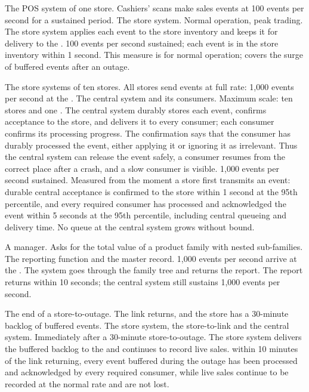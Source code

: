   {The POS system of one store.}
  {Cashiers' scans make sales events at 100 events per second for a sustained period.}
  {The store system.}
  {Normal operation, peak trading.}
  {The store system applies each event to the store inventory and keeps it for delivery to the \DC.}
  {100 events per second sustained; each event is in the store inventory within 1 second. This measure is for normal operation;  covers the surge of buffered events after an outage.}

  {The store systems of ten stores.}
  {All stores send events at full rate: 1{,}000 events per second at the \DC.}
  {The central system and its consumers.}
  {Maximum scale: ten stores and one \DC.}
  {The central system durably stores each event, confirms acceptance to the store, and delivers it to every consumer; each consumer confirms its processing progress. The confirmation says that the consumer has durably processed the event, either applying it or ignoring it as irrelevant. Thus the central system can release the event safely, a consumer resumes from the correct place after a crash, and a slow consumer is visible.}
  {1{,}000 events per second sustained. Measured from the moment a store first transmits an event: durable central acceptance is confirmed to the store within 1 second at the 95th percentile, and every required consumer has processed and acknowledged the event within 5 seconds at the 95th percentile, including central queueing and delivery time. No queue at the central system grows without bound.}

  {A \DC manager.}
  {Asks for the total value of a product family with nested sub-families.}
  {The reporting function and the master record.}
  {1{,}000 events per second arrive at the \DC.}
  {The system goes through the family tree and returns the report.}
  {The report returns within 10 seconds; the central system still sustains 1{,}000 events per second.}

  {The end of a store-to-\DC outage.}
  {The link returns, and the store has a 30-minute backlog of buffered events.}
  {The store system, the store-to-\DC link and the central system.}
  {Immediately after a 30-minute store-to-\DC outage.}
  {The store system delivers the buffered backlog to the \DC and continues to record live sales.}
  {within 10 minutes of the link returning, every event buffered during the outage has been processed and acknowledged by every required consumer, while live sales continue to be recorded at the normal rate and are not lost.}

